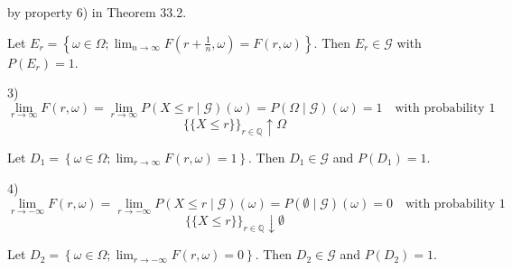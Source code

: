 by property 6) in Theorem 33.2.

Let \(E_r = \left\{\omega \in \Omega; \lim_{n \to \infty} F\left(r + \frac{1}{n}, \omega\right) = F(r, \omega)\right\}\). Then \(E_r \in \mathcal{G}\) with \(P(E_r) = 1\).

3) 
\[
\lim_{r \to \infty} F(r, \omega) = \lim_{r \to \infty} P(X \leq r \mid \mathcal{G})(\omega) = P(\Omega \mid \mathcal{G})(\omega) = 1 \quad \text{with probability 1}
\]
\[
\{\{X \leq r\}\}_{r \in \mathbb{Q}} \uparrow \Omega
\]

Let \(D_1 = \left\{\omega \in \Omega; \lim_{r \to \infty} F(r, \omega) = 1\right\}\). Then \(D_1 \in \mathcal{G}\) and \(P(D_1) = 1\).

4)
\[
\lim_{r \to -\infty} F(r, \omega) = \lim_{r \to -\infty} P(X \leq r \mid \mathcal{G})(\omega) = P(\emptyset \mid \mathcal{G})(\omega) = 0 \quad \text{with probability 1}
\]
\[
\{\{X \leq r\}\}_{r \in \mathbb{Q}} \downarrow \emptyset
\]

Let \(D_2 = \left\{\omega \in \Omega; \lim_{r \to -\infty} F(r, \omega) = 0\right\}\). Then \(D_2 \in \mathcal{G}\) and \(P(D_2) = 1\).


